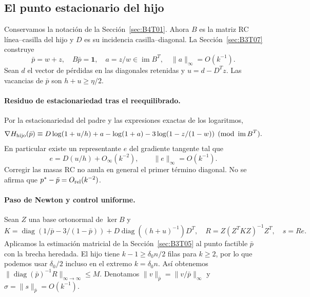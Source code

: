 \subsection{El punto estacionario del hijo}\label{sec:B4T02}
Conservamos la notación de la Sección~\ref{sec:B4T01}. Ahora $B$ es la matriz RC línea--casilla del
hijo y $D$ es su incidencia casilla--diagonal. La Sección~\ref{sec:B3T07} construye
\[
 \bar p=w+z,\quad B\bar p=\mathbf1,\quad
 a=z/w\in\operatorname{im}B^T,\quad \|a\|_\infty=O(k^{-1}).
\]
Sean $d$ el vector de pérdidas en las diagonales retenidas y $u=d-D^Tz$.
Las vacancias de $\bar p$ son $h+u\ge\eta/2$.

\paragraph{Residuo de estacionariedad tras el reequilibrado.}
Por la estacionariedad del padre y las expresiones exactas de los logaritmos,
\[
 \nabla H_{\rm hijo}(\bar p)\equiv
 D\log(1+u/h)+a-\log(1+a)-3\log(1-z/(1-w))
 \pmod{\operatorname{im}B^T}.
\]
En particular existe un representante $e$ del gradiente tangente tal que
\[
 e=D(u/h)+O_\infty(k^{-2}),\qquad \|e\|_\infty=O(k^{-1}).
\]
Corregir las masas RC no anula en general el primer término diagonal.
No se afirma que $p^*-\bar p=O_{\rm rel}(k^{-2})$.

\paragraph{Paso de Newton y control uniforme.}
Sean $Z$ una base ortonormal de $\ker B$ y
\[
 K=\operatorname{diag}(1/\bar p-3/(1-\bar p))
       +D\operatorname{diag}((h+u)^{-1})D^T,\quad
 R=Z(Z^TKZ)^{-1}Z^T,\quad s=Re.
\]
Aplicamos la estimación matricial de la Sección~\ref{sec:B3T05} al punto factible $\bar p$ con la
brecha heredada. El hijo tiene $k-1\ge\delta_0 n/2$ filas para $k\ge2$, por lo que podemos usar
$\delta_0/2$ incluso en el extremo $k=\delta_0n$. Así obtenemos
$\|\operatorname{diag}(\bar p)^{-1}R\|_{\infty\to\infty}\le M$.
Denotamos $\|v\|_{\bar p}=\|v/\bar p\|_\infty$ y
$\sigma=\|s\|_{\bar p}=O(k^{-1})$.

